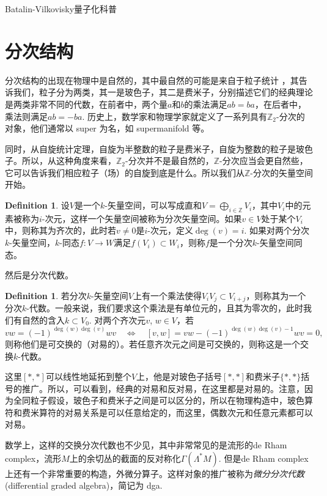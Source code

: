 \documentclass[10pt]{article}
\theoremstyle{definition}
\newtheorem{defi}[para]{Definition}
\theoremstyle{plain}
\begin{document}
Batalin-Vilkovisky量子化科普

\section{分次结构}

分次结构的出现在物理中是自然的，其中最自然的可能是来自于粒子统计%
，其告诉我们，粒子分为两类，其一是玻色子，其二是费米子，分别描述它们的经典理论是两类非常不同的代数，在前者中，两个量$a$和$b$的乘法满足$ab=ba$，在后者中，乘法则满足$ab=-ba$. 历史上，数学家和物理学家就定义了一系列具有$\mathbb{Z}_2$-分次的对象，他们通常以 super 为名，如 supermanifold 等。

同时，从自旋统计定理，自旋为半整数的粒子是费米子，自旋为整数的粒子是玻色子。所以，从这种角度来看，$\mathbb{Z}_2$-分次并不是最自然的，$\mathbb{Z}$-分次应当会更自然些，它可以告诉我们相应粒子（场）的自旋到底是什么。所以我们从$\mathbb{Z}$-分次的矢量空间开始。

\begin{defi}
    设$V$是一个$k$-矢量空间，可以写成直和$V=\bigoplus_{i\in\mathbb Z} V_i$，其中$V_i$中的元素被称为$i$-次元，这样一个矢量空间被称为分次矢量空间。如果$v\in V$处于某个$V_i$中，则称其为齐次的，此时若$v\neq 0$是$i$-次元，定义$\deg(v)=i$. 如果对两个分次$k$-矢量空间，$k$-同态$f:V\to W$满足$f(V_i)\subset W_i$，则称$f$是一个分次$k$-矢量空间同态。
\end{defi}

然后是分次代数。

\begin{defi}
    若分次$k$-矢量空间$V$上有一个乘法使得$V_iV_j\subset V_{i+j}$，则称其为一个分次$k$-代数。一般来说，我们要求这个乘法是有单位元的，且其为零次的，此时我们有自然的含入$k\subset V_0$. 对两个齐次元$v$, $w\in V$，若
\[
    vw=(-1)^{\deg(w)\deg(v)}wv\quad \Leftrightarrow \quad 
    [v,w]=vw-(-1)^{\deg(w)\deg(v)-1}wv=0,
\]
则称他们是可交换的（对易的）。若任意齐次元之间是可交换的，则称这是一个交换$k$-代数。
\end{defi}

这里$[*,*]$可以线性地延拓到整个$V$上，他是对玻色子括号$[*,*]$和费米子$\{*,*\}$括号的推广。所以，可以看到，经典的对易和反对易，在这里都是对易的。注意，因为全同粒子假设，玻色子和费米子之间是可以区分的，所以在物理构造中，玻色算符和费米算符的对易关系是可以任意给定的，而这里，偶数次元和任意元素都可以对易。

数学上，这样的交换分次代数也不少见，其中非常常见的是流形的de Rham complex，流形$M$上的余切丛的截面的反对称化$\Gamma(\Lambda^*M)$. 但是de Rham complex上还有一个非常重要的构造，外微分算子。这样对象的推广被称为\textit{微分分次代数} (differential graded algebra)，简记为 dga. 
\end{document}
